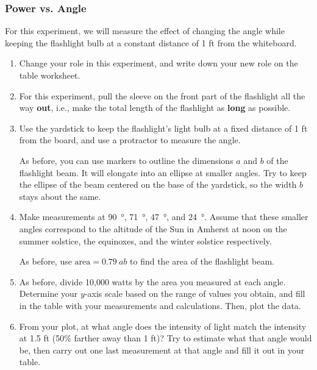 \documentclass[main.tex]{subfiles}
\begin{document}
\subsubsection{Power vs. Angle}
For this experiment, we will measure the effect of changing the angle while keeping the flashlight bulb at a constant distance of 1 ft from the whiteboard.

\begin{enumerate}[1.]
\item Change your role in this experiment, and write down your new role on the table worksheet.

\item For this experiment, pull the sleeve on the front part of the flashlight all the way \textbf{out}, i.e., make the total length of the flashlight as \textbf{long} as possible.

\item Use the yardstick to keep the flashlight's light bulb at a fixed distance of 1 ft from the board, and use a protractor to measure the angle.

As before, you can use markers to outline the dimensions $a$ and $b$ of the flashlight beam. It will elongate into an ellipse at smaller angles. Try to keep the ellipse of the beam centered on the base of the yardstick, so the width $b$ stays about the same.

\item Make measurements at \SI{90}{\degree}, \SI{71}{\degree}, \SI{47}{\degree}, and \SI{24}{\degree}. Assume that these smaller angles correspond to the altitude of the Sun in Amherst at noon on the summer solstice, the equinoxes, and the winter solstice respectively.

As before, use $\text{area} = 0.79\ ab$ to find the area of the flashlight beam.

\item As before, divide 10,000 watts by the area you measured at each angle. Determine your $y$-axis scale based on the range of values you obtain, and fill in the table with your measurements and calculations. Then, plot the data.

\item From your plot, at what angle does the intensity of light match the intensity at 1.5 ft (50\% farther away than 1 ft)? Try to estimate what that angle would be, then carry out one last measurement at that angle and fill it out in your table.

\end{enumerate}
\end{document}
